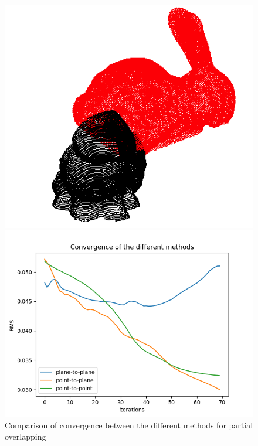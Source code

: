 \documentclass[11pt,letterpaper,leqno]{article}
\begin{document}
\begin{figure}[ht!]
\begin{minipage}{0.5\linewidth}
    \end{minipage}
    \begin{minipage}{0.5\linewidth}
        \includegraphics[width=\linewidth]{img/comparison_6_clouds.png}
        \end{minipage}\hfill
        \begin{minipage}{0.5\linewidth}
        \includegraphics[width=\linewidth]{img/comparison_6.png}
        \end{minipage}
    \caption{Comparison of convergence between the different methods for partial overlapping}
    \label{fig:comp5_6}
\end{figure}
\end{document}
